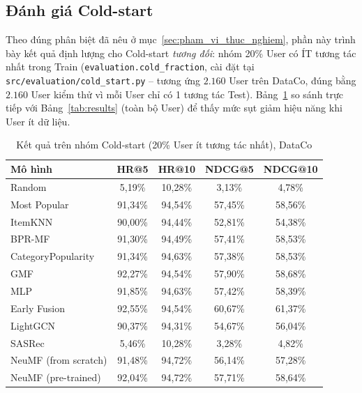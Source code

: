 \subsection{Đánh giá Cold-start}
\label{subsec:cold_start_results}

Theo đúng phân biệt đã nêu ở mục~\ref{sec:pham_vi_thuc_nghiem}, phần này trình bày kết quả định lượng cho Cold-start \textit{tương đối}: nhóm 20\% User có ÍT tương tác nhất trong Train (\texttt{evaluation.cold\_fraction}, cài đặt tại \texttt{src/evaluation/cold\_start.py} -- tương ứng $2.160$ User trên DataCo, đúng bằng $2.160$ User kiểm thử vì mỗi User chỉ có 1 tương tác Test). Bảng~\ref{tab:cold_start_dataco} so sánh trực tiếp với Bảng~\ref{tab:results} (toàn bộ User) để thấy mức sụt giảm hiệu năng khi User ít dữ liệu.

\begin{table}[htbp]
    \centering
    \caption{Kết quả trên nhóm Cold-start (20\% User ít tương tác nhất), DataCo}
    \label{tab:cold_start_dataco}
    \begin{tabular}{|l|c|c|c|c|}
        \hline
        \textbf{Mô hình} & \textbf{HR@5} & \textbf{HR@10} & \textbf{NDCG@5} & \textbf{NDCG@10} \\
        \hline
        Random & 5,19\% & 10,28\% & 3,13\% & 4,78\% \\
        \hline
        Most Popular & 91,34\% & 94,54\% & 57,45\% & 58,56\% \\
        \hline
        ItemKNN & 90,00\% & 94,44\% & 52,81\% & 54,38\% \\
        \hline
        BPR-MF & 91,30\% & 94,49\% & 57,41\% & 58,53\% \\
        \hline
        CategoryPopularity & 91,34\% & 94,63\% & 57,38\% & 58,53\% \\
        \hline
        GMF & 92,27\% & 94,54\% & 57,90\% & 58,68\% \\
        \hline
        MLP & 91,85\% & 94,63\% & 57,42\% & 58,39\% \\
        \hline
        Early Fusion & 92,55\% & 94,54\% & 60,67\% & 61,37\% \\
        \hline
        LightGCN & 90,37\% & 94,31\% & 54,67\% & 56,04\% \\
        \hline
        SASRec & 5,46\% & 10,28\% & 3,28\% & 4,82\% \\
        \hline
        NeuMF (from scratch) & 91,48\% & 94,72\% & 56,14\% & 57,28\% \\
        \hline
        NeuMF (pre-trained) & 92,04\% & 94,72\% & 57,71\% & 58,64\% \\
        \hline
    \end{tabular}
\end{table}

